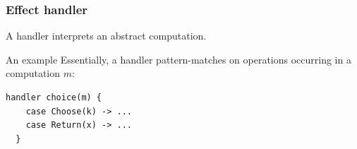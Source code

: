 \begin{frame}[fragile]
  \frametitle{Effect handler}
  \begin{definition}[Handler]
    A handler interprets an abstract computation.
  \end{definition}
  \begin{block}{An example}
    Essentially, a handler pattern-matches on operations occurring in a computation $m$:
    \begin{lstlisting}[style=spacey]
  handler choice(m) {
    case Choose(k) -> ...
    case Return(x) -> ...
  }
    \end{lstlisting}
  \end{block}
\end{frame}







